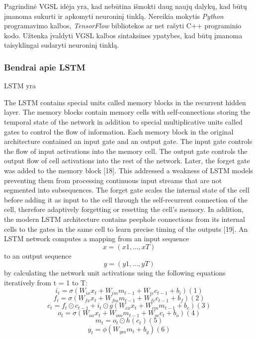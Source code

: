 \documentclass{VUMIFInfBakalaurinis}
\begin{document}
Pagrindinė VGSL idėja yra, kad nebūtina išmokti daug naujų dalykų, kad būtų įmanoma sukurti ir apkomyti neuroninį tinklą.
Nereikia mokytis \textit{Python} programavimo kalbos, \textit{TensorFlow} bibliotekos ar net rašyti C++ programinio kodo.
Užtenka įvaldyti VGSL kalbos sintaksines ypatybes, kad būtų įmanoma taisyklingai sudaryti neuroninį tinklą.

\subsubsection{Bendrai apie LSTM}
LSTM yra 

The LSTM contains special units called memory blocks in the recurrent hidden layer. 
The memory blocks contain memory cells with self-connections storing the temporal state of the network in addition to special multiplicative units called gates to control the flow of information. 
Each memory block in the original architecture contained an input gate and an output gate.
The input gate controls the flow of input activations into the memory cell. 
The output gate controls the output flow of cell activations into the rest of the network. 
Later, the forget gate was added to the memory block [18]. 
This addressed a weakness of LSTM models preventing them from processing continuous input streams that are not segmented into subsequences.
The forget gate scales the internal state of the cell before adding it as input to the cell through the self-recurrent connection of the cell, therefore adaptively forgetting or resetting the cell’s memory. 
In addition, the modern LSTM architecture contains peephole connections from its internal cells to the gates in the same cell to learn precise timing of the outputs [19].
An LSTM network computes a mapping from an input sequence 
\begin{equation*}
  x = (x1, ..., xT) 
\end{equation*}
to an output sequence 
\begin{equation*}
  y = (y1, ..., yT)
\end{equation*}
by calculating the network unit activations using the following equations iteratively from t = 1 to T:
\begin{equation*}
  i_t = \sigma(W_{ix}x_t + W_{im}m_{t−1} + W_{ic}c_{t−1} + b_i) (1)
\end{equation*}
\begin{equation*}
  f_t = \sigma(W_{fx}x_t + W_{fm}m_{t−1} + W_{fc}c_{t−1} + b_f) (2)
\end{equation*}
\begin{equation*}
  c_t = f_t \odot c_{t−1} + i_t\odot g(W_{cx}x_t + W_{cm}m_{t−1} + b_c) (3)
\end{equation*}
\begin{equation*}
  o_t = \sigma(W_{ox}x_t + W_{om}m_{t−1} + W_{oc}c_t + b_o) (4)
\end{equation*}
\begin{equation*}
  m_t = o_t \odot h(c_t) (5)
\end{equation*}
\begin{equation*}
  y_t = \phi(W_{ym}m_t + b_y) (6)
\end{equation*}
\end{document}
